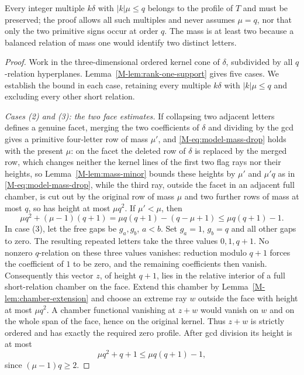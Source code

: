 \documentclass[11pt,reqno]{amsart}
\theoremstyle{plain}
\theoremstyle{definition}
\theoremstyle{plain}
\theoremstyle{plain}
\theoremstyle{plain}
\theoremstyle{plain}
\theoremstyle{plain}
\theoremstyle{plain}
\theoremstyle{definition}
\theoremstyle{definition}
\theoremstyle{definition}
\theoremstyle{plain}
\begin{document}
Every integer multiple $k\delta$ with $|k|\mu\le q$ belongs to the profile
of $T$ and must be preserved; the proof allows all such multiples and never
assumes $\mu=q$, nor that only the two primitive signs occur at order $q$.
The mass is at least two because a balanced relation of mass one would
identify two distinct letters.

\begin{proof}
Work in the three-dimensional ordered kernel cone of $\delta$, subdivided
by all $q$-relation hyperplanes. Lemma~\ref{M-lem:rank-one-support} gives
five cases. We establish the bound in each case, retaining every multiple
$k\delta$ with $|k|\mu\le q$ and excluding every other short relation.

\smallskip\noindent\emph{Cases (2) and (3): the two face estimates.}
If collapsing two adjacent letters defines a genuine facet, merging the two
coefficients of $\delta$ and dividing by the gcd gives a primitive
four-letter row of mass $\mu'$, and \eqref{M-eq:model-mass-drop} holds with
the present $\mu$: on the facet the deleted row of $\delta$ is replaced by
the merged row, which changes neither the kernel lines of the first two flag
rays nor their heights, so Lemma~\ref{M-lem:mass-minor} bounds these heights
by $\mu'$ and $\mu'q$ as in \eqref{M-eq:model-mass-drop},
while the third ray, outside the facet in an adjacent full chamber, is cut
out by the original row of mass $\mu$ and two further rows of mass at most
$q$, so has height at most $\mu q^2$. If $\mu'<\mu$, then
\begin{equation}\label{M-eq:mass-drop-budget}
 \mu q^2+(\mu-1)(q+1)=\mu q(q+1)-(q-\mu+1)\le\mu q(q+1)-1 .
\end{equation}
In case (3), let the free gaps be $g_a,g_b$, $a<b$.
Set $g_a=1$, $g_b=q$ and all other gaps to zero. The resulting repeated
letters take the three values $0,1,q+1$. No nonzero $q$-relation on
these three values vanishes: reduction modulo $q+1$ forces the
coefficient of $1$ to be zero, and the remaining coefficients then vanish.
Consequently this vector $z$, of height $q+1$, lies in the relative
interior of a full short-relation chamber on the face. Extend this
chamber by Lemma~\ref{M-lem:chamber-extension} and choose an extreme ray
$w$ outside the face with height at most $\mu q^2$.
A chamber functional vanishing at $z+w$ would vanish on $w$ and on
the whole span of the face, hence on the original kernel. Thus $z+w$
is strictly ordered and has exactly the required zero profile.
After gcd division its height is at most
\begin{equation}\label{M-eq:two-zero-budget}
 \mu q^2+q+1\le\mu q(q+1)-1,
\end{equation}
since $(\mu-1)q\ge2$.


\end{proof}
\end{document}
